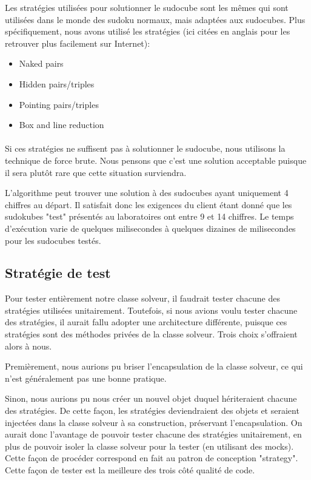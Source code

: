 Les stratégies utilisées pour solutionner le sudocube sont les mêmes qui sont utilisées dans le monde des sudoku normaux, mais adaptées aux sudocubes. Plus spécifiquement, nous avons utilisé les stratégies (ici citées en anglais pour les retrouver plus facilement sur Internet):\newline

\begin{itemize}
\item Naked pairs
\item Hidden pairs/triples
\item Pointing pairs/triples
\item Box and line reduction
\end{itemize}

\paragraph{}Si ces stratégies ne suffisent pas à solutionner le sudocube, nous utilisons la technique de force brute. Nous pensons que c'est une solution acceptable puisque il sera plutôt rare que cette situation surviendra.

L'algorithme peut trouver une solution à des sudocubes ayant uniquement 4 chiffres au départ. Il satisfait donc les exigences du client étant donné que les sudokubes "test" présentés au laboratoires ont entre 9 et 14 chiffres. Le temps d'exécution varie de quelques milisecondes à quelques dizaines de milisecondes pour les sudocubes testés.

\subsection{Stratégie de test}
Pour tester entièrement notre classe solveur, il faudrait tester chacune des stratégies utilisées unitairement. Toutefois, si nous avions voulu tester chacune des stratégies, il aurait fallu adopter une architecture différente, puisque ces stratégies sont des méthodes privées de la classe solveur. Trois choix s'offraient alors à nous.

Premièrement, nous aurions pu briser l'encapsulation de la classe solveur, ce qui n'est généralement pas une bonne pratique.

Sinon, nous aurions pu nous créer un nouvel objet duquel hériteraient chacune des stratégies. De cette façon, les stratégies deviendraient des objets et seraient injectées dans la classe solveur à sa construction, préservant l'encapsulation. On aurait donc l'avantage de pouvoir tester chacune des stratégies unitairement, en plus de pouvoir isoler la classe solveur pour la tester (en utilisant des mocks). Cette façon de procéder correspond en fait au patron de conception "strategy". Cette façon de tester est la meilleure des trois côté qualité de code.

